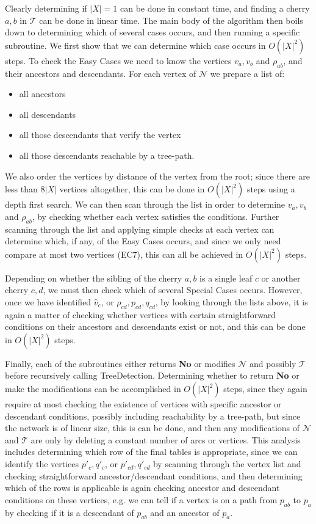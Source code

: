 \documentclass[11pt]{amsart}
\begin{document}
Clearly determining if $|X|=1$ can be done in constant time, and finding a cherry $a,b$ in ${{\mathcal T}}$ can be done in linear time. The main body of the algorithm then boils down to determining which of several cases occurs, and then running a specific subroutine. We first show that we can determine which case occurs in $O(|X|^2)$ steps. To check the Easy Cases we need to know the vertices $v_a,v_b$ and $\rho_{ab}$, and their ancestors and descendants. For each vertex of ${{\mathcal N}}$ we prepare a list of:
\begin{itemize}
\item all ancestors
\item all descendants
\item all those descendants that verify the vertex
\item all those descendants reachable by a tree-path.
\end{itemize} We also order the vertices by distance of the vertex from the root; since there are less than $8|X|$ vertices altogether, this can be done in $O(|X|^2)$ steps using a depth first search. We can then scan through the list in order to determine $v_a,v_b$ and $\rho_{ab}$, by checking whether each vertex satisfies the conditions. Further scanning through the list and applying simple checks at each vertex can determine which, if any, of the Easy Cases occurs, and since we only need compare at most two vertices (EC7), this can all be achieved in $O(|X|^2)$ steps.

Depending on whether the sibling of the cherry $a,b$ is a single leaf $c$ or another cherry $c,d$, we must then check which of several Special Cases occurs. However, once we have identified $\hat v_c$, or $\rho_{cd},p_{cd},q_{cd}$, by looking through the lists above, it is again a matter of checking whether vertices with certain straightforward conditions on their ancestors and descendants exist or not, and this can be done in $O(|X|^2)$ steps.

Finally, each of the subroutines either returns \textbf{No} or modifies ${{\mathcal N}}$ and possibly ${{\mathcal T}}$ before recursively calling {\sc TreeDetection}. Determining whether to return \textbf{No} or make the modifications can be  accomplished in $O(|X|^2)$ steps, since they again require at most checking the existence of vertices with specific ancestor or descendant conditions, possibly including reachability by a tree-path, but since the network is of linear size, this is can be done, and then any modifications of ${{\mathcal N}}$ and  ${{\mathcal T}}$ are only by deleting a constant number of arcs or vertices. This analysis includes determining which row of the final tables is appropriate, since we can identify the vertices $p'_c,q'_c$, or $p'_{cd},q'_{cd}$ by scanning through the vertex list and checking straightforward ancestor/descendant conditions, and then determining which of the rows is applicable is again checking ancestor and descendant conditions on these vertices, e.g. we can tell if a vertex is on a path from $p_{ab}$ to $p_a$ by checking if it is a descendant of $p_{ab}$ and an ancestor of $p_a$. 
\end{document}
